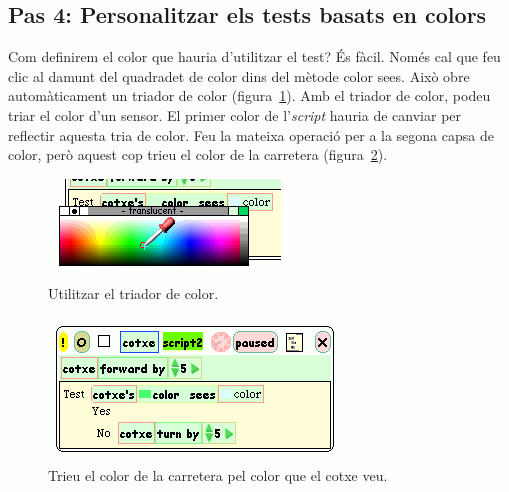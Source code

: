 \subsection{Pas 4: Personalitzar els tests basats en colors}
Com definirem el color que hauria d'utilitzar el test? És fàcil. Només cal que feu clic al damunt del quadradet de color dins del mètode \textsf{color sees}. Això obre automàticament un triador de color (figura~\ref{fig2444}). Amb el  triador de color, podeu triar el color d'un sensor. El primer color de l'\emph{script} hauria de canviar per reflectir aquesta tria de color. Feu la mateixa operació per a la segona capsa de color, però aquest cop trieu el color de la carretera (figura~\ref{fig2445}).
\begin{figure}[h!]
\begin{center}
\includegraphics[scale=0.8]{Imatges/figura24-44}
\end{center}
\caption{Utilitzar el triador de color.}
\label{fig2444}
\end{figure}
\begin{figure}[h!]
\begin{center}
\includegraphics[scale=0.6]{Imatges/figura24-45}
\end{center}
\caption{Trieu el color de la carretera pel color que el cotxe veu.}
\label{fig2445}
\end{figure}

